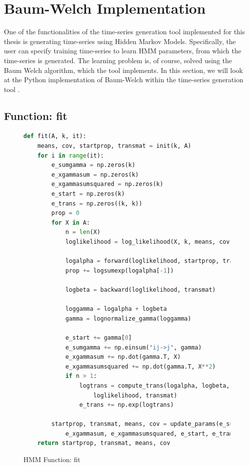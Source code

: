 
\chapter{Baum-Welch Implementation}\label{chapter:hmm-impl}

One of the functionalities of the time-series generation tool implemented for this thesis is generating time-series using Hidden Markov Models. Specifically, the user can specify training time-series to learn HMM parameters, from which the time-series is generated. The learning problem is, of course, solved using the Baum Welch algorithm, which the tool implements. In this section, we will look at the Python implementation of Baum-Welch within the time-series generation tool \parencite{tsgenerator}.

\section{Function: fit}

\begin{figure}
\begin{singlespace}
\begin{lstlisting}[language=Python]
def fit(A, k, it):
    means, cov, startprop, transmat = init(k, A)
    for i in range(it):
        e_sumgamma = np.zeros(k)
        e_xgammasum = np.zeros(k)
        e_xgammasumsquared = np.zeros(k)
        e_start = np.zeros(k)
        e_trans = np.zeros((k, k))
        prop = 0
        for X in A:
            n = len(X)
            loglikelihood = log_likelihood(X, k, means, cov)

            logalpha = forward(loglikelihood, startprop, transmat)
            prop += logsumexp(logalpha[-1])

            logbeta = backward(loglikelihood, transmat)

            loggamma = logalpha + logbeta
            gamma = lognormalize_gamma(loggamma)

            e_start += gamma[0]
            e_sumgamma += np.einsum("ij->j", gamma)
            e_xgammasum += np.dot(gamma.T, X)
            e_xgammasumsquared += np.dot(gamma.T, X**2)
            if n > 1:
                logtrans = compute_trans(logalpha, logbeta, \
                    loglikelihood, transmat)
                e_trans += np.exp(logtrans)

        startprop, transmat, means, cov = update_params(e_sumgamma, \
            e_xgammasum, e_xgammasumsquared, e_start, e_trans)
    return startprop, transmat, means, cov
\end{lstlisting}
\end{singlespace}
   
\caption{HMM Function: fit}    
\label{fig:hmm-fit-listing}
\end{figure}

